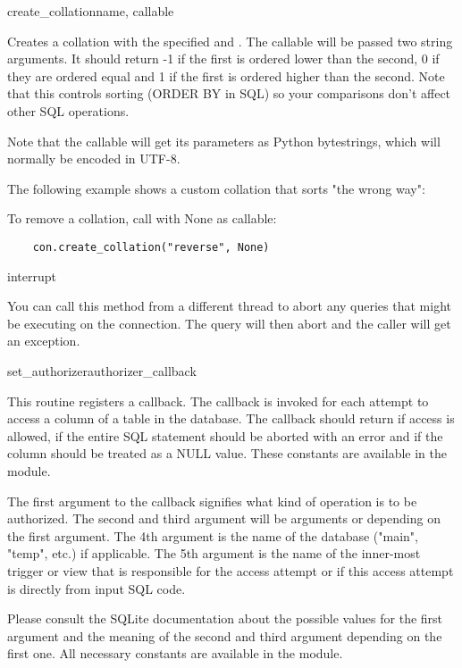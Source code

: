 \begin{methoddesc}{create_collation}{name, callable}

Creates a collation with the specified  and . The
callable will be passed two string arguments. It should return -1 if the first
is ordered lower than the second, 0 if they are ordered equal and 1 if the
first is ordered higher than the second.  Note that this controls sorting
(ORDER BY in SQL) so your comparisons don't affect other SQL operations.

Note that the callable will get its parameters as Python bytestrings, which
will normally be encoded in UTF-8.

The following example shows a custom collation that sorts "the wrong way":

  

To remove a collation, call  with None as callable:

\begin{verbatim}
    con.create_collation("reverse", None)
\end{verbatim}
\end{methoddesc}

\begin{methoddesc}{interrupt}{}

You can call this method from a different thread to abort any queries that
might be executing on the connection. The query will then abort and the caller
will get an exception.
\end{methoddesc}

\begin{methoddesc}{set_authorizer}{authorizer_callback}

This routine registers a callback. The callback is invoked for each attempt to
access a column of a table in the database. The callback should return
 if access is allowed,  if the entire
SQL statement should be aborted with an error and  if
the column should be treated as a NULL value. These constants are available in
the  module.

The first argument to the callback signifies what kind of operation is to be
authorized. The second and third argument will be arguments or 
depending on the first argument. The 4th argument is the name of the database
("main", "temp", etc.) if applicable. The 5th argument is the name of the
inner-most trigger or view that is responsible for the access attempt or
 if this access attempt is directly from input SQL code.

Please consult the SQLite documentation about the possible values for the first
argument and the meaning of the second and third argument depending on the
first one. All necessary constants are available in the 
module.
\end{methoddesc}

